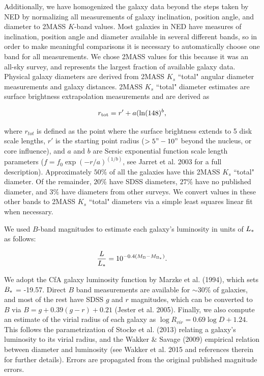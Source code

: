 \documentclass[twocolumn,tighten]{aastex6}
\begin{document}

Additionally, we have homogenized the galaxy data beyond the steps taken by NED by normalizing all measurements of galaxy inclination, position angle, and diameter to 2MASS $K$-band values. Most galaxies in NED have measures of inclination, position angle and diameter available in several different bands, so in order to make meaningful comparisons it is necessary to automatically choose one band for all measurements. We chose 2MASS values for this because it was an all-sky survey, and represents the largest fraction of available galaxy data. Physical galaxy diameters are derived from 2MASS $K_{s}$ ``total" angular diameter measurements and galaxy distances. 2MASS $K_{s}$ ``total" diameter estimates are surface brightness extrapolation measurements and are derived as 

\begin{equation}
	r_{\rm tot} = r' + a(\ln(148)^b,
\end{equation}

\noindent where $r_{tot}$ is defined as the point where the surface brightness extends to 5 disk scale lengths, $r'$ is the starting point radius ($>5" - 10"$ beyond the nucleus, or core influence), and $a$ and $b$ are Sersic exponential function scale length parameters ($f = f_0 \exp{(-r/a)}^{(1/b)}$, see Jarret et al. 2003 for a full description). Approximately $50\%$ of all the galaxies have this 2MASS $K_{s}$ ``total" diameter. Of the remainder, $20\%$ have SDSS diameters, $27\%$ have no published diameter, and $3\%$ have diameters from other surveys. We convert values in these other bands to 2MASS $K_{s}$ ``total" diameters via a simple least squares linear fit when necessary.

We used $B$-band magnitudes to estimate each galaxy's luminosity in units of $L_{\**}$ as follows:

\begin{equation}
	\frac{L}{L_{\**}} = 10^{-0.4 (M_{\rm B} - M_{\rm B_{\**}})}.
\end{equation}

We adopt the CfA galaxy luminosity function by Marzke et al. (1994), which sets $B_{\**} $ = -19.57. Direct $B$ band measurements are available for $\sim 30\%$ of galaxies, and most of the rest have SDSS $g$ and $r$ magnitudes, which can be converted to $B$ via $B = g + 0.39 (g-r) + 0.21$ (Jester et al. 2005). Finally, we also compute an estimate of the virial radius of each galaxy as $\log R_{vir} = 0.69 \log D + 1.24$. This follows the parametrization of Stocke et al. (2013) relating a galaxy's luminosity to its virial radius, and the Wakker $\&$ Savage (2009) empirical relation between diameter and luminosity (see Wakker et al. 2015 and references therein for further details). Errors are propagated from the original published magnitude errors.
\end{document}
